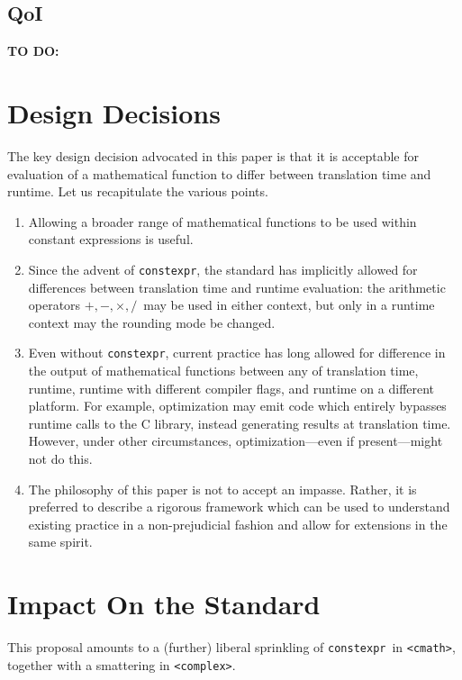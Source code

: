 \documentclass[prd,twocolumn,amsmath,amssymb,nofootinbib,eqsecnum]{revtex4-1}
\newcommand{\constexpr}{\code{constexpr}\xspace}
\newcommand{\code}[1]{{\tt #1}}
\newcommand{\header}[1]{{\tt <#1>}}
\newcommand{\cmath}{\header{cmath}}
\newcommand{\complex}{\header{complex}}
\newcommand{\Operators}{\ensuremath{+,-,\times,/}}
\begin{document}
\subsection{QoI}

{\bf TO DO:}


\section{Design Decisions}

The key design decision advocated in this paper is that it is acceptable for evaluation of a mathematical function to differ between translation time and runtime. Let us recapitulate the various points.

\begin{enumerate}
	\item Allowing a broader range of mathematical functions to be used within constant expressions is useful.
	
	\item Since the advent of \constexpr, the standard has implicitly allowed for differences between translation time and runtime evaluation: the arithmetic operators \Operators\ may be used in either context, but only in a runtime context may the rounding mode be changed.
	
	\item Even without \constexpr, current practice has long allowed for difference in the output of mathematical functions between any of translation time, runtime, runtime with different compiler flags, and runtime on a different platform. For example, optimization may emit code which entirely bypasses runtime calls to the C library, instead generating results at translation time. However, under other circumstances, optimization---even if present---might not do this.
	
	\item The philosophy of this paper is not to accept an impasse. Rather, it is preferred to describe a rigorous framework which can be used to understand existing practice in a non-prejudicial fashion and allow for extensions in the same spirit.
\end{enumerate}


\section{Impact On the Standard}

This proposal amounts to a (further) liberal sprinkling of \constexpr\ in \cmath, together with a smattering in \complex.
\end{document}
